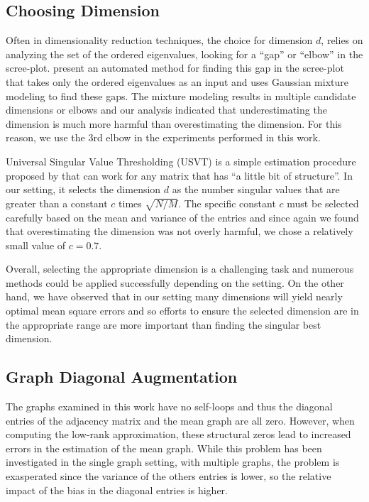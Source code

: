 \documentclass[10pt,letterpaper]{article}
\begin{document}
\subsection{Choosing Dimension}
\label{section:dim_select}
Often in dimensionality reduction techniques, the choice for dimension $d$, relies on analyzing the set of the ordered eigenvalues, looking for a ``gap'' or ``elbow'' in the scree-plot. \citet{zhu2006automatic} present an automated method for finding this gap in the scree-plot that takes only the ordered eigenvalues as an input and uses Gaussian mixture modeling to find these gaps.
The mixture modeling results in multiple candidate dimensions or elbows and our analysis indicated that underestimating the dimension is much more harmful than overestimating the dimension.
For this reason, we use the 3rd elbow in the experiments performed in this work.

Universal Singular Value Thresholding (USVT) is a simple estimation procedure proposed by \citet{chatterjee2015matrix} that can work for any matrix that has ``a little bit of structure''. 
In our setting, it selects the dimension $d$ as the number singular values that are greater than a constant $c$ times $\sqrt{N/M}$.
The specific constant $c$ must be selected carefully based on the mean and variance of the entries and since again we found that overestimating the dimension was not overly harmful, we chose a relatively small value of $c=0.7$.

Overall, selecting the appropriate dimension is a challenging task and numerous methods could be applied successfully depending on the setting.
On the other hand, we have observed that in our setting many dimensions will yield nearly optimal mean square errors and so efforts to ensure the selected dimension are in the appropriate range are more important than finding the singular best dimension.



\subsection{Graph Diagonal Augmentation}
\label{section:diag_aug}
The graphs examined in this work have no self-loops and thus the diagonal entries of the adjacency matrix and the mean graph are all zero.
However, when computing the low-rank approximation, these structural zeros lead to increased errors in the estimation of the mean graph. 
While this problem has been investigated in the single graph setting, with multiple graphs, the problem is exasperated since the variance of the others entries is lower, so the relative impact of the bias in the diagonal entries is higher.
\end{document}
